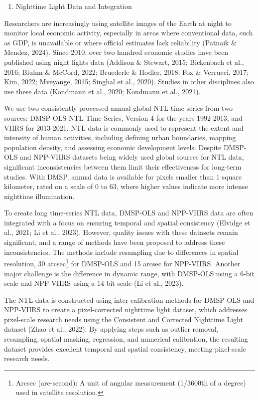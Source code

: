 \begin{enumerate}
\def\labelenumi{\arabic{enumi}.}
\setcounter{enumi}{2}
\item
  Nighttime Light Data and Integration
\end{enumerate}

Researchers are increasingly using satellite images of the Earth at
night to monitor local economic activity, especially in areas where
conventional data, such as GDP, is unavailable or where official
estimates lack reliability (Patnaik \& Mendez, 2024). Since 2010, over
two hundred economic studies have been published using night lights data
(Addison \& Stewart, 2015; Bickenbach et al., 2016; Bluhm \& McCord,
2022; Bruederle \& Hodler, 2018; Fox \& Verrucci, 2017; Kim, 2022;
Mveyange, 2015; Singhal et al., 2020). Studies in other disciplines also
use these data (Kondmann et al., 2020; Kondmann et al., 2021).

We use two consistently processed annual global NTL time series from two
sources: DMSP-OLS NTL Time Series, Version 4 for the years 1992-2013,
and VIIRS for 2013-2021. NTL data is commonly used to represent the
extent and intensity of human activities, including defining urban
boundaries, mapping population density, and assessing economic
development levels. Despite DMSP-OLS and NPP-VIIRS datasets being widely
used global sources for NTL data, significant inconsistencies between
them limit their effectiveness for long-term studies. With DMSP, annual
data is available for pixels smaller than 1 square kilometer, rated on a
scale of 0 to 63, where higher values indicate more intense nighttime
illumination.

To create long time-series NTL data, DMSP-OLS and NPP-VIIRS data are
often integrated with a focus on ensuring temporal and spatial
consistency (Elvidge et al., 2021; Li et al., 2023). However, quality
issues with these datasets remain significant, and a range of methods
have been proposed to address these inconsistencies. The methods include
resampling due to differences in spatial resolution, 30
arcsec\footnote{Arcsec (arc-second): A unit of angular measurement
  (1/3600th of a degree) used in satellite resolution.} for DMSP-OLS and
15 arcsec for NPP-VIIRS. Another major challenge is the difference in
dynamic range, with DMSP-OLS using a 6-bit scale and NPP-VIIRS using a
14-bit scale (Li et al., 2023).

The NTL data is constructed using inter-calibration methods for DMSP-OLS
and NPP-VIIRS to create a pixel-corrected nighttime light dataset, which
addresses pixel-scale research needs using the Consistent and Corrected
Nighttime Light dataset (Zhao et al., 2022). By applying steps such as
outlier removal, resampling, spatial masking, regression, and numerical
calibration, the resulting dataset provides excellent temporal and
spatial consistency, meeting pixel-scale research needs.

